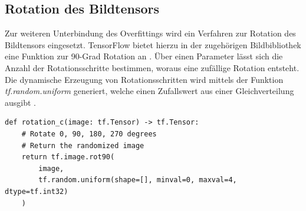 \subsection{Rotation des Bildtensors}

Zur weiteren Unterbindung des Overfittings wird ein Verfahren zur Rotation des Bildtensors eingesetzt. TensorFlow bietet hierzu in der zugehörigen Bildbibliothek eine Funktion zur 90-Grad Rotation an \cite{tf_r_rot90}. Über einen Parameter lässt sich die Anzahl der Rotationsschritte bestimmen, woraus eine zufällige Rotation entsteht. Die dynamische Erzeugung von Rotationsschritten wird mittels der Funktion \emph{tf.random.uniform} generiert, welche einen Zufallswert aus einer Gleichverteilung ausgibt \cite{tf_r_uniform}.

\vspace*{10mm}

\begin{lstlisting}[caption={Python Funktion zum zufälligen Rotieren des Bildtensors}]
	def rotation_c(image: tf.Tensor) -> tf.Tensor:
    # Rotate 0, 90, 180, 270 degrees
    # Return the randomized image
    return tf.image.rot90(
        image,
        tf.random.uniform(shape=[], minval=0, maxval=4, dtype=tf.int32)
    )
\end{lstlisting}

